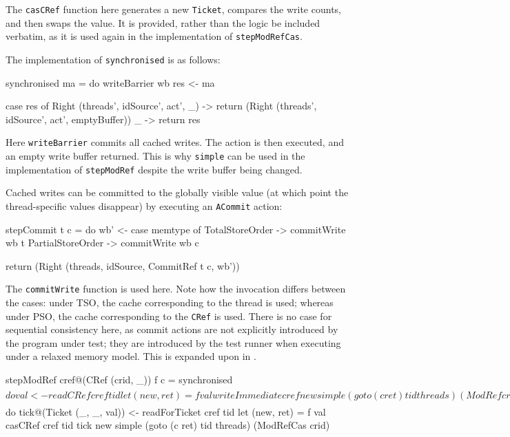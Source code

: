 
The \verb|casCRef| function here generates a new \verb|Ticket|,
compares the write counts, and then swaps the value. It is provided,
rather than the logic be included verbatim, as it is used again in the
implementation of \verb|stepModRefCas|.

The implementation of \verb|synchronised| is as follows:

\begin{haskellcode}
synchronised ma = do
  writeBarrier wb
  res <- ma

  case res of
    Right (threads', idSource', act', _) -> return
      (Right (threads', idSource', act', emptyBuffer))
    _ -> return res
\end{haskellcode}

Here \verb|writeBarrier| commits all cached writes. The action is then
executed, and an empty write buffer returned. This is why
\verb|simple| can be used in the implementation of \verb|stepModRef|
despite the write buffer being changed.

Cached writes can be committed to the globally visible value (at which
point the thread-specific values disappear) by executing an
\verb|ACommit| action:

\begin{haskellcode}
stepCommit t c = do
  wb' <- case memtype of
    TotalStoreOrder   -> commitWrite wb t
    PartialStoreOrder -> commitWrite wb c

  return (Right (threads, idSource, CommitRef t c, wb'))
\end{haskellcode}

The \verb|commitWrite| function is used here. Note how the invocation
differs between the cases: under TSO, the cache corresponding to the
thread is used; whereas under PSO, the cache corresponding to the
\verb|CRef| is used. There is no case for sequential consistency here,
as commit actions are not explicitly introduced by the program under
test; they are introduced by the test runner when executing under a
relaxed memory model. This is expanded upon in
.

\begin{haskellcode}
stepModRef cref@(CRef (crid, _)) f c = synchronised $ do
  val <- readCRef cref tid
  let (new, ret) = f val
  writeImmediate cref new
  simple (goto (c ret) tid threads) (ModRef crid)

stepModRefCas cref@(CRef (crid, _)) f c = synchronised $ do
  tick@(Ticket (_, _, val)) <- readForTicket cref tid
  let (new, ret) = f val
  casCRef cref tid tick new
  simple (goto (c ret) tid threads) (ModRefCas crid)
\end{haskellcode}

